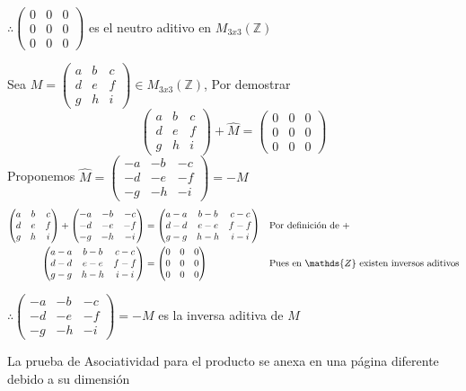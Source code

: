 \documentclass[letterpaper]{article}
\newcommand{\Ceros}{\begin{pmatrix}
		0 & 0 & 0\\
		0 & 0 & 0\\
		0 & 0 & 0 
\end{pmatrix}}
\newcommand{\Mmat}{\begin{pmatrix}
		a & b & c\\
		d & e & f\\
		g & h & i
\end{pmatrix}}
\newcommand{\mtt}{M_{3x3}(\mathds{Z})}
\newcommand{\Z}{\mathds{Z}}
\renewcommand{\*}{\cdot}
\theoremstyle{definition}
\begin{document}
\begin{center}
	$ \therefore \Ceros $ es el neutro aditivo en $ \mtt $
\end{center}
Sea $ M = \Mmat \in \mtt $, Por demostrar $$ \Mmat + \hat{M} = \Ceros $$
Proponemos $ \hat{M} = \begin{pmatrix}
-a & -b & -c\\
-d & -e & -f\\
-g & -h & -i
\end{pmatrix}  = -M$
\begin{align*}
	\Mmat + \begin{pmatrix}
	-a & -b & -c\\
	-d & -e & -f\\
	-g & -h & -i
	\end{pmatrix} & = \begin{pmatrix}
	a-a & b-b & c-c\\
	d-d & e-e & f-f\\
	g-g & h-h & i-i
	\end{pmatrix} && \text{Por definición de +}\\
	\begin{pmatrix}
	a-a & b-b & c-c\\
	d-d & e-e & f-f\\
	g-g & h-h & i-i
	\end{pmatrix} & = \Ceros &&\text{Pues en $ \Z $ existen inversos aditivos}
\end{align*}
\begin{center}
	$ \therefore \begin{pmatrix}
	-a & -b & -c\\
	-d & -e & -f\\
	-g & -h & -i
	\end{pmatrix} = -M $ es la inversa aditiva de $ M $
\end{center}
La prueba de Asociatividad para el producto se anexa en una página diferente debido a su dimensión
\end{document}
